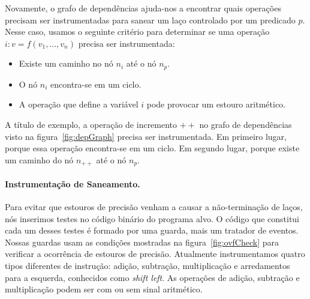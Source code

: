 \documentclass{llncs}
\begin{document}
Novamente, o grafo de dependências ajuda-nos a encontrar quais operações
precisam ser instrumentadas para sanear um laço controlado por um
predicado $p$.
Nesse caso, usamos o seguinte critério para determinar se uma operação
$i : v = f(v_1, \ldots, v_n)$ precisa ser instrumentada:
%
\begin{itemize}
\item Existe um caminho no nó $n_i$ até o nó $n_p$.
\item O nó $n_i$ encontra-se em um ciclo.
\item A operação que define a variável $i$ pode provocar um estouro aritmético.
\end{itemize}
%
A título de exemplo, a operação de incremento $++$ no grafo de dependências
visto na figura~\ref{fig:depGraph} precisa ser instrumentada.
Em primeiro lugar, porque essa operação encontra-se em um ciclo.
Em segundo lugar, porque existe um caminho do nó $n_{++}$ até o nó
$n_p$.

\paragraph{Instrumentação de Saneamento. }
Para evitar que estouros de precisão venham a causar a não-terminação
de laços, nós inserimos testes no código binário do programa alvo.
O código que constitui cada um desses testes é formado por uma guarda, mais
um tratador de eventos.
Nossas guardas usam as condições mostradas na figura~\ref{fig:ovfCheck} para
verificar a ocorrência de estouros de precisão.
Atualmente instrumentamos quatro tipos diferentes de instrução:
adição, subtração, multiplicação e arredamentos para a esquerda, conhecidos como {\em shift left}.
As operações de adição, subtração e multiplicação podem ser com ou sem sinal
aritmético.
\end{document}
